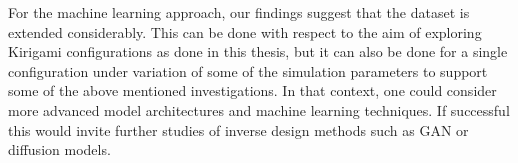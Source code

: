 For the machine learning approach, our findings suggest that the dataset is extended considerably. This can be done with respect to the aim of exploring Kirigami configurations as done in this thesis, but it can also be done for a single configuration under variation of some of the simulation parameters to support some of the above mentioned investigations. In that context, one could consider more advanced model architectures and machine learning techniques. If successful this would invite further studies of inverse design methods such as GAN or diffusion models. 



